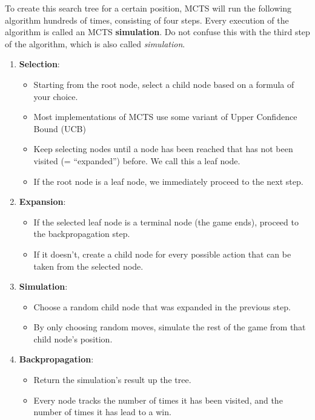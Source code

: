 \documentclass{article}
\begin{document}
To create this search tree for a certain position, MCTS will run the following algorithm hundreds of times, 
consisting of four steps. 
Every execution of the algorithm is called an MCTS \textbf{simulation}. 
Do not confuse this with the third step of the algorithm, which is also called \textit{simulation}. 

\begin{enumerate}
    \item \textbf{Selection}:
    \begin{itemize}
        \item Starting from the root node, select a child node based on a formula of your choice.
        \item Most implementations of MCTS use some variant of Upper Confidence Bound (UCB) \cite{MLMonteCarlo2019}
        \item Keep selecting nodes until a node has been reached that has not been visited (= ``expanded'') before. We call this a leaf node.
        \item If the root node is a leaf node, we immediately proceed to the next step.
    \end{itemize}
    \item \textbf{Expansion}:
    \begin{itemize}
        \item If the selected leaf node is a terminal node (the game ends), proceed to the backpropagation step.
        \item If it doesn't, create a child node for every possible action that can be taken from the selected node.
    \end{itemize}
    \item \textbf{Simulation}:
    \begin{itemize}
        \item Choose a random child node that was expanded in the previous step.
        \item By only choosing random moves, simulate the rest of the game from that child node's position.
    \end{itemize}
    \item \textbf{Backpropagation}:
    \begin{itemize}
        \item Return the simulation's result up the tree.
        \item Every node tracks the number of times it has been visited, and the number of times it has lead to a win.
    \end{itemize}
\end{enumerate}
\end{document}
